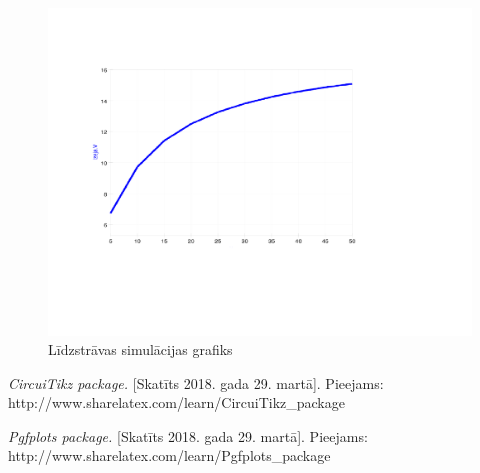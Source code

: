 \documentclass{report}
\begin{document}
\begin{figure}[h]
\centering
\includegraphics[width=\textwidth, height=\textheight, keepaspectratio]{sprieguma_grafiks.png}
    \caption{Līdzstrāvas simulācijas grafiks}
    \label{fig:2.5}
\end{figure}
\label{s_nobeigums}

\begin{thebibliography}{9}
\textit{CircuiTikz package.} [Skatīts 2018. gada 29. martā].
Pieejams: http://www.sharelatex.com/learn/CircuiTikz\_{}package

\textit{Pgfplots package.} [Skatīts 2018. gada 29. martā].
Pieejams: http://www.sharelatex.com/learn/Pgfplots\_{}package
 
\end{thebibliography}
\end{document}
